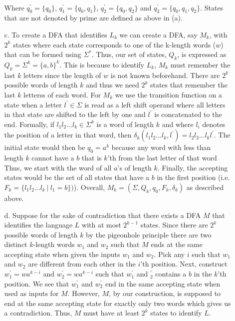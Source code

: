 \documentclass [10pt]{article}
\begin{document}
\begin{enumerate}
\begin{enumerate}
		\\Where $q_{0}^{\prime} = \{q_{0}\}$, $q_{1}^{\prime} = \{q_{0}, q_{1}\}$, $q_{2}^{\prime} = \{q_{0}, q_{2}\}$ and $q_{3}^{\prime} = \{q_{0}, q_{1}, q_{2}\}$. States that are not denoted by prime are defined as above in (a).
		\item[c.]To create a DFA that identifies $L_{k}$ we can create a DFA, say $M_{k}$, with $2^{k}$ states where each state corresponds to one of the k-length words ($w$) that can be formed using $\Sigma^{*}$. Thus, our set of states, $Q_{k}$, is expressed as $Q_{k} = \Sigma^{k} = \{a,b\}^{k}$. This is because to identify $L_{k}$, $M_{k}$ must remember the last $k$ letters since the length of $w$ is not known beforehand. There are $2^{k}$ possible words of length $k$ and thus we need $2^{k}$ states that remember the last $k$ letterss of each word. For $M_{k}$ we use the transition function on a state when a letter $l^{\prime} \in \Sigma$ is read as a left shift operand where all letters in that state are shifted to the left by one and $l^{\prime}$ is concatenated to the end. Formally, if $l_{1}l_{2}...l_{k} \in \Sigma^{k}$ is a word of length $k$ and where $l_{i}$ denotes the position of a letter in that word, then $\delta_{k}(l_{1}l_{2}...l_{k}, l^{\prime}) = l_{2}l_{3}...l_{k}l^{\prime}$. The initial state would then be $q_{0} = a^{k}$ because any word with less than length $k$ cannot have a $b$ that is $k$'th from the last letter of that word Thus, we start with the word of all $a$'s of length $k$. Finally, the accepting states would be the set of all states that have a $b$ in the first position (i.e. $F_{k} = \{l_{1}l_{2}...l_{k}\:|\:l_{1} = b\})$). Overall, $M_{k} = (\Sigma, Q_{k}, q_{0}, F_{k}, \delta_{k})$ as described above.
		\item[d.]Suppose for the sake of contradiction that there exists a DFA $M$ that identifies the language $L$ with at most $2^{k-1}$ states. Since there are $2^{k}$ possible words of length $k$ by the pigeonhole principle there are two distinct $k$-length words $w_{1}$ and $w_{2}$ such that $M$ ends at the same accepting state when given the inputs $w_{1}$ and $w_{2}$. Pick any $i$ such that $w_{1}$ and $w_{2}$ are different from each other in the $i$'th position. Next, construct $w_{1}^{\prime} = wa^{k-i}$ and $w_{2}^{\prime} = wa^{k-i}$ such that $w_{1}^{\prime}$ and $_{2}^{\prime}$ contains a $b$ in the $k$'th position. We see that $w_{1}^{\prime}$ and $w_{2}^{\prime}$ end in the same accepting state when used as inputs for $M$. However, $M$, by our construction, is supposed to end at the same accepting state for exactly only two words which gives us a contradiction. Thus, $M$ must have at least $2^{k}$ states to identify $L$.

\end{enumerate}
\end{enumerate}
\end{document}
